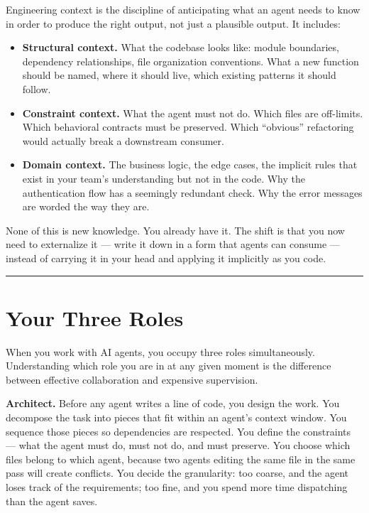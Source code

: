 \documentclass[
  a4paper,
  DIV=11,
  numbers=noendperiod]{scrreprt}
\providecommand{\tightlist}{%
  \setlength{\itemsep}{0pt}\setlength{\parskip}{0pt}}
\begin{document}
Engineering context is the discipline of anticipating what an agent
needs to know in order to produce the right output, not just a plausible
output. It includes:

\begin{itemize}
\tightlist
\item
  \textbf{Structural context.} What the codebase looks like: module
  boundaries, dependency relationships, file organization conventions.
  What a new function should be named, where it should live, which
  existing patterns it should follow.
\item
  \textbf{Constraint context.} What the agent must not do. Which files
  are off-limits. Which behavioral contracts must be preserved. Which
  ``obvious'' refactoring would actually break a downstream consumer.
\item
  \textbf{Domain context.} The business logic, the edge cases, the
  implicit rules that exist in your team's understanding but not in the
  code. Why the authentication flow has a seemingly redundant check. Why
  the error messages are worded the way they are.
\end{itemize}

None of this is new knowledge. You already have it. The shift is that
you now need to externalize it --- write it down in a form that agents
can consume --- instead of carrying it in your head and applying it
implicitly as you code.

\begin{center}\rule{0.5\linewidth}{0.5pt}\end{center}

\section{Your Three Roles}\label{your-three-roles}

When you work with AI agents, you occupy three roles simultaneously.
Understanding which role you are in at any given moment is the
difference between effective collaboration and expensive supervision.

\textbf{Architect.} Before any agent writes a line of code, you design
the work. You decompose the task into pieces that fit within an agent's
context window. You sequence those pieces so dependencies are respected.
You define the constraints --- what the agent must do, must not do, and
must preserve. You choose which files belong to which agent, because two
agents editing the same file in the same pass will create conflicts. You
decide the granularity: too coarse, and the agent loses track of the
requirements; too fine, and you spend more time dispatching than the
agent saves.
\end{document}
